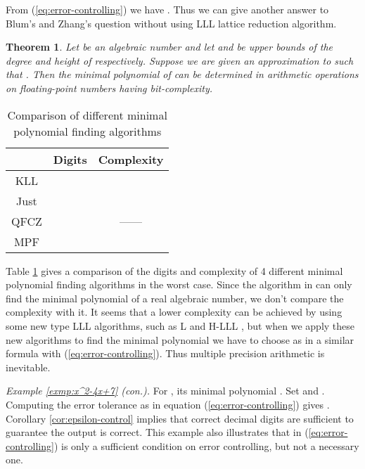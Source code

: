 \documentclass{sig-alternate}
\newtheorem{thm}[theorem]{Theorem}
\numberwithin{theorem}{section} \numberwithin{equation}{section}
\begin{document}
From  (\ref{eq:error-controlling}) we have . Thus we can give
another answer to  Blum's and Zhang's question without using LLL
lattice reduction algorithm.

\begin{thm}\label{thm:complexity-of-finding-algorithm-fpa}
Let  be an algebraic number and let  and  be upper
bounds of the degree and height of  respectively. Suppose we
are given an approximation  to  such that
. Then
the minimal polynomial of  can be determined in  arithmetic operations on floating-point
numbers having  bit-complexity.
\end{thm}


\begin{table}[H]
\begin{tabular}{||c|c|c|}
  \hline
& Digits & Complexity \\\hline
  KLL\cite{KLL1988} &  &  \\\hline
  Just\cite{Jus1989} &  & 
\\\hline
  QFCZ\cite{QFC2009} &  & ------ \\\hline
  MPF &  &  \\
  \hline
\end{tabular}\caption{Comparison of different minimal polynomial finding
algorithms}\label{tab:comparison of MPFs}
\end{table}

Table \ref{tab:comparison of MPFs} gives a comparison of the digits
and complexity of 4 different minimal polynomial finding algorithms
in the worst case. Since the algorithm in \cite{QFC2009} can only find the minimal
polynomial of a real algebraic number, we don't compare the
complexity with it. It seems that a lower complexity can be achieved
by using some new type LLL algorithms, such as L \cite{NS2005}
and H-LLL \cite{MSV2009}, but when we apply these new algorithms to
find the minimal polynomial we have to choose  as in a
similar formula with (\ref{eq:error-controlling}). Thus multiple
precision arithmetic is inevitable.










\vspace{2 mm}

\emph{Example \ref{exmp:x^2-4x+7} (con.).} For , its minimal polynomial . Set  and . Computing the error tolerance as in equation
(\ref{eq:error-controlling}) gives .
Corollary \ref{cor:epsilon-control} implies that
 correct decimal digits are
sufficient to guarantee the output is correct. This example also
illustrates that  in (\ref{eq:error-controlling}) is only
a sufficient condition on error controlling, but not a necessary
one.
\end{document}

